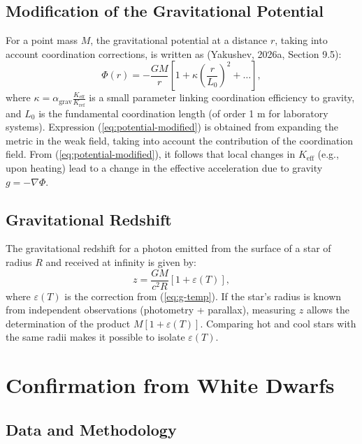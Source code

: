 \documentclass[12pt]{article}
\theoremstyle{remark}
\newcommand{\Keff}{K_{\mathrm{eff}}}
\newcommand{\eps}{\varepsilon}
\begin{document}
	\subsection{Modification of the Gravitational Potential}
	\label{subsec:potential}
	
	For a point mass $M$, the gravitational potential at a distance $r$, taking into account coordination corrections, is written as (Yakushev, 2026a, Section 9.5):
	\begin{equation}
		\Phi(r) = -\frac{GM}{r} \left[ 1 + \kappa \left( \frac{r}{L_0} \right)^2 + \dots \right],
		\label{eq:potential-modified}
	\end{equation}
	where $\kappa = \alpha_{\text{grav}} \frac{\Keff}{K_{\text{ref}}}$ is a small parameter linking coordination efficiency to gravity, and $L_0$ is the fundamental coordination length (of order 1 m for laboratory systems). Expression (\ref{eq:potential-modified}) is obtained from expanding the metric in the weak field, taking into account the contribution of the coordination field. From (\ref{eq:potential-modified}), it follows that local changes in $\Keff$ (e.g., upon heating) lead to a change in the effective acceleration due to gravity $g = -\nabla \Phi$.
	
	\subsection{Gravitational Redshift}
	\label{subsec:redshift}
	
	The gravitational redshift for a photon emitted from the surface of a star of radius $R$ and received at infinity is given by:
	\begin{equation}
		z = \frac{GM}{c^2 R} \left[ 1 + \eps(T) \right],
		\label{eq:redshift}
	\end{equation}
	where $\eps(T)$ is the correction from (\ref{eq:g-temp}). If the star's radius is known from independent observations (photometry + parallax), measuring $z$ allows the determination of the product $M[1+\eps(T)]$. Comparing hot and cool stars with the same radii makes it possible to isolate $\eps(T)$.
	
	\section{Confirmation from White Dwarfs}
	\label{sec:wd}
	
	\subsection{Data and Methodology}
	\label{subsec:wd-data}
	
\end{document}
